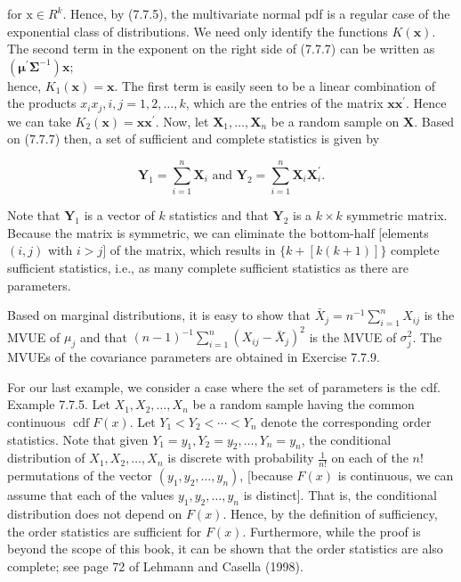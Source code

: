 for $\mathrm{x} \in R^{k}$. Hence, by (7.7.5), the multivariate normal pdf is a regular case of the exponential class of distributions. We need only identify the functions $K(\mathbf{x})$. The second term in the exponent on the right side of (7.7.7) can be written as $\left(\boldsymbol{\mu}^{\prime} \boldsymbol{\Sigma}^{-1}\right) \mathbf{x}$;\\
hence, $K_{1}(\mathbf{x})=\mathbf{x}$. The first term is easily seen to be a linear combination of the products $x_{i} x_{j}, i, j=1,2, \ldots, k$, which are the entries of the matrix $\mathbf{x x}^{\prime}$. Hence we can take $K_{2}(\mathbf{x})=\mathbf{x x}^{\prime}$. Now, let $\mathbf{X}_{1}, \ldots, \mathbf{X}_{n}$ be a random sample on $\mathbf{X}$. Based on (7.7.7) then, a set of sufficient and complete statistics is given by


\begin{equation*}
\mathbf{Y}_{1}=\sum_{i=1}^{n} \mathbf{X}_{i} \text { and } \mathbf{Y}_{2}=\sum_{i=1}^{n} \mathbf{X}_{i} \mathbf{X}_{i}^{\prime} . \tag{7.7.8}
\end{equation*}


Note that $\mathbf{Y}_{1}$ is a vector of $k$ statistics and that $\mathbf{Y}_{2}$ is a $k \times k$ symmetric matrix. Because the matrix is symmetric, we can eliminate the bottom-half [elements $(i, j)$ with $i>j]$ of the matrix, which results in $\{k+[k(k+1)]\}$ complete sufficient statistics, i.e., as many complete sufficient statistics as there are parameters.

Based on marginal distributions, it is easy to show that $\bar{X}_{j}=n^{-1} \sum_{i=1}^{n} X_{i j}$ is the MVUE of $\mu_{j}$ and that $(n-1)^{-1} \sum_{i=1}^{n}\left(X_{i j}-\bar{X}_{j}\right)^{2}$ is the MVUE of $\sigma_{j}^{2}$. The MVUEs of the covariance parameters are obtained in Exercise 7.7.9.

For our last example, we consider a case where the set of parameters is the cdf.\\
Example 7.7.5. Let $X_{1}, X_{2}, \ldots, X_{n}$ be a random sample having the common continuous $\operatorname{cdf} F(x)$. Let $Y_{1}<Y_{2}<\cdots<Y_{n}$ denote the corresponding order statistics. Note that given $Y_{1}=y_{1}, Y_{2}=y_{2}, \ldots, Y_{n}=y_{n}$, the conditional distribution of $X_{1}, X_{2}, \ldots, X_{n}$ is discrete with probability $\frac{1}{n!}$ on each of the $n!$ permutations of the vector $\left(y_{1}, y_{2}, \ldots, y_{n}\right)$, [because $F(x)$ is continuous, we can assume that each of the values $y_{1}, y_{2}, \ldots, y_{n}$ is distinct]. That is, the conditional distribution does not depend on $F(x)$. Hence, by the definition of sufficiency, the order statistics are sufficient for $F(x)$. Furthermore, while the proof is beyond the scope of this book, it can be shown that the order statistics are also complete; see page 72 of Lehmann and Casella (1998).


